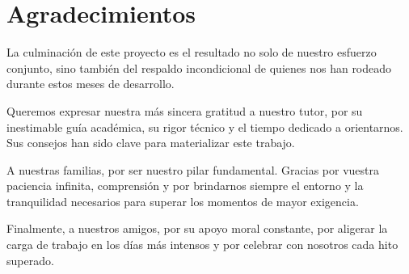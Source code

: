 \chapter*{Agradecimientos}

La culminación de este proyecto es el resultado no solo de nuestro esfuerzo conjunto, sino también del respaldo incondicional de quienes nos han rodeado durante estos meses de desarrollo.

Queremos expresar nuestra más sincera gratitud a nuestro tutor, por su inestimable guía académica, su rigor técnico y el tiempo dedicado a orientarnos. Sus consejos han sido clave para materializar este trabajo.

A nuestras familias, por ser nuestro pilar fundamental. Gracias por vuestra paciencia infinita, comprensión y por brindarnos siempre el entorno y la tranquilidad necesarios para superar los momentos de mayor exigencia.

Finalmente, a nuestros amigos, por su apoyo moral constante, por aligerar la carga de trabajo en los días más intensos y por celebrar con nosotros cada hito superado.
